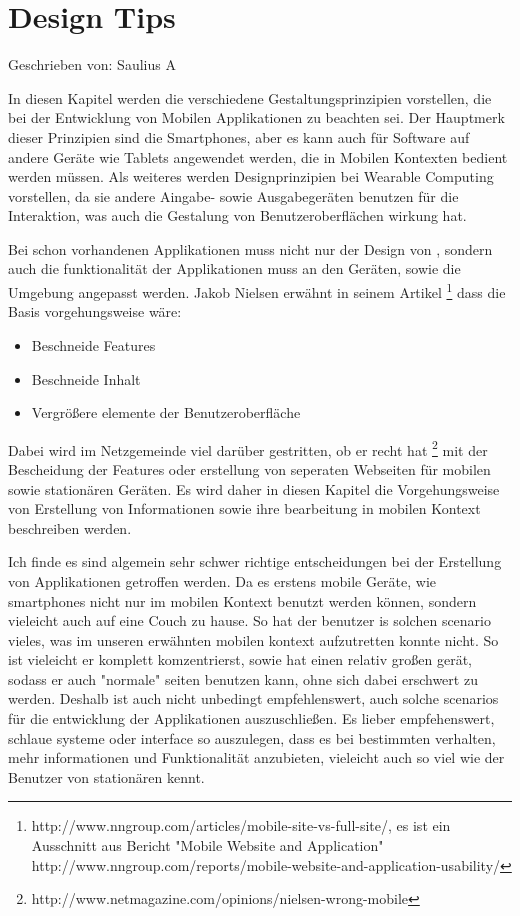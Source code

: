 
\section{Design Tips}

Geschrieben von: Saulius A

In diesen Kapitel werden die verschiedene Gestaltungsprinzipien vorstellen, die bei der Entwicklung von Mobilen Applikationen zu beachten sei. Der Hauptmerk dieser Prinzipien sind die Smartphones, aber es kann auch für Software auf andere Geräte wie Tablets angewendet werden, die in Mobilen Kontexten bedient werden müssen. Als weiteres werden Designprinzipien bei Wearable Computing vorstellen, da sie andere Aingabe- sowie Ausgabegeräten benutzen für die Interaktion, was auch die Gestalung von Benutzeroberflächen wirkung hat.

Bei schon vorhandenen Applikationen muss nicht nur der Design von , sondern auch die funktionalität der Applikationen muss an den Geräten, sowie die Umgebung angepasst werden. Jakob Nielsen erwähnt in seinem Artikel \footnote{http://www.nngroup.com/articles/mobile-site-vs-full-site/, es ist ein Ausschnitt aus Bericht "Mobile Website and Application" http://www.nngroup.com/reports/mobile-website-and-application-usability/} dass die Basis vorgehungsweise wäre:

\begin{itemize}
	\item Beschneide Features
	\item Beschneide Inhalt
	\item Vergrößere elemente der Benutzeroberfläche
\end{itemize}

Dabei wird im Netzgemeinde viel darüber gestritten, ob er recht hat \footnote{http://www.netmagazine.com/opinions/nielsen-wrong-mobile} mit der Bescheidung der Features oder erstellung von seperaten Webseiten für mobilen sowie stationären Geräten. Es wird daher in diesen Kapitel die Vorgehungsweise von Erstellung von Informationen sowie ihre bearbeitung in mobilen Kontext beschreiben werden.

Ich finde es sind algemein sehr schwer richtige entscheidungen bei der Erstellung von Applikationen getroffen werden. Da es erstens mobile Geräte, wie smartphones nicht nur im mobilen Kontext benutzt werden können, sondern vieleicht auch auf eine Couch zu hause. So hat der benutzer is solchen scenario vieles, was im unseren erwähnten mobilen kontext aufzutretten konnte nicht. So ist vieleicht er komplett komzentrierst, sowie hat einen relativ großen gerät, sodass er auch "normale" seiten benutzen kann, ohne sich dabei erschwert zu werden. Deshalb ist auch nicht unbedingt empfehlenswert, auch solche scenarios für die entwicklung der Applikationen auszuschließen. Es lieber empfehenswert, schlaue systeme oder interface so auszulegen, dass es bei bestimmten verhalten, mehr informationen und Funktionalität anzubieten, vieleicht auch so viel wie der Benutzer von stationären kennt.

